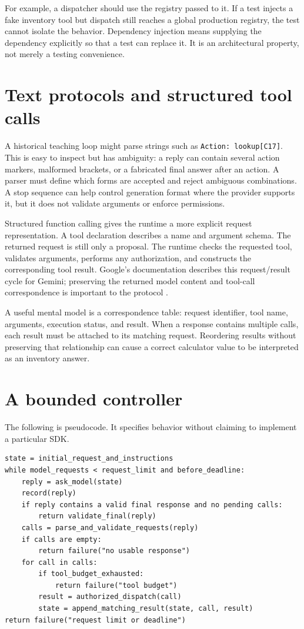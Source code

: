 For example, a dispatcher should use the registry passed to it. If a test injects a fake inventory tool but dispatch still reaches a global production registry, the test cannot isolate the behavior. Dependency injection means supplying the dependency explicitly so that a test can replace it. It is an architectural property, not merely a testing convenience.

\section{Text protocols and structured tool calls}
A historical teaching loop might parse strings such as \texttt{Action: lookup[C17]}. This is easy to inspect but has ambiguity: a reply can contain several action markers, malformed brackets, or a fabricated final answer after an action. A parser must define which forms are accepted and reject ambiguous combinations. A stop sequence can help control generation format where the provider supports it, but it does not validate arguments or enforce permissions.

Structured function calling gives the runtime a more explicit request representation. A tool declaration describes a name and argument schema. The returned request is still only a proposal. The runtime checks the requested tool, validates arguments, performs any authorization, and constructs the corresponding tool result. Google's documentation describes this request/result cycle for Gemini; preserving the returned model content and tool-call correspondence is important to the protocol \cite{gemini-tools}.

A useful mental model is a correspondence table: request identifier, tool name, arguments, execution status, and result. When a response contains multiple calls, each result must be attached to its matching request. Reordering results without preserving that relationship can cause a correct calculator value to be interpreted as an inventory answer.

\section{A bounded controller}
The following is pseudocode. It specifies behavior without claiming to implement a particular SDK.

\begin{Verbatim}[breaklines=true,breakanywhere=true,fontsize=\small,frame=single]
state = initial_request_and_instructions
while model_requests < request_limit and before_deadline:
    reply = ask_model(state)
    record(reply)
    if reply contains a valid final response and no pending calls:
        return validate_final(reply)
    calls = parse_and_validate_requests(reply)
    if calls are empty:
        return failure("no usable response")
    for call in calls:
        if tool_budget_exhausted:
            return failure("tool budget")
        result = authorized_dispatch(call)
        state = append_matching_result(state, call, result)
return failure("request limit or deadline")
\end{Verbatim}


